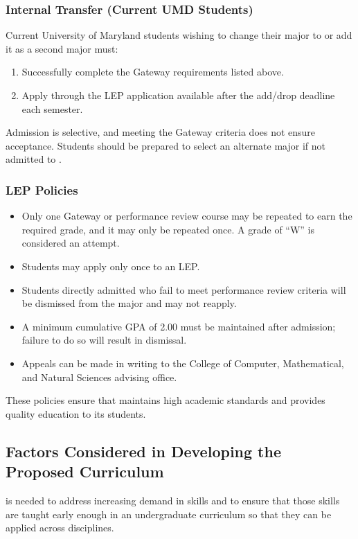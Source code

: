 \subsubsection*{Internal Transfer (Current UMD Students)}
Current University of Maryland students wishing to change their major to \short{} or add it as a second major must:
\begin{enumerate}
    \item Successfully complete the Gateway requirements listed above.
    \item Apply through the LEP application available after the add/drop deadline each semester.
\end{enumerate}

Admission is selective, and meeting the Gateway criteria does not ensure acceptance. Students should be prepared to select an alternate major if not admitted to \short{}.

\subsubsection*{LEP Policies}
\begin{itemize}
    \item Only one Gateway or performance review course may be repeated to earn the required grade, and it may only be repeated once. A grade of ``W'' is considered an attempt.
    \item Students may apply only once to an LEP.
    \item Students directly admitted who fail to meet performance review criteria will be dismissed from the major and may not reapply.
    \item A minimum cumulative GPA of 2.00 must be maintained after admission; failure to do so will result in dismissal.
    \item Appeals can be made in writing to the College of Computer, Mathematical, and Natural Sciences advising office.
\end{itemize}

These policies ensure that \short{} maintains high academic standards and provides quality education to its students.

\subsection{Factors Considered in Developing the Proposed Curriculum}

\name{} is needed to address increasing demand in \ai{} skills and to ensure that those skills are taught early enough in an undergraduate curriculum so that they can be applied across disciplines.

